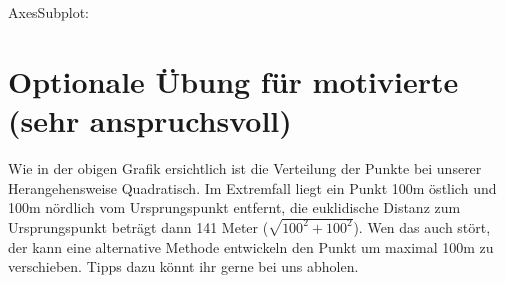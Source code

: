 \documentclass[letterpaper,10pt,english]{sphinxmanual}
\begin{document}
\begin{sphinxVerbatim}[commandchars=\\\{\}]
\PYGZlt{}AxesSubplot:\PYGZgt{}
\end{sphinxVerbatim}


\section{Optionale Übung für motivierte (sehr anspruchsvoll)}
\label{\detokenize{02_04_Einzelpunkt_Verschieben:optionale-ubung-fur-hochmotivierte-sehr-anspruchsvoll}}
Wie in der obigen Grafik ersichtlich ist die Verteilung der Punkte bei unserer Herangehensweise Quadratisch. Im Extremfall liegt ein Punkt 100m östlich und 100m nördlich vom Ursprungspunkt entfernt, die euklidische Distanz zum Ursprungspunkt beträgt dann 141 Meter (\(\sqrt{100^2+100^2}\)). Wen das auch stört, der kann eine alternative Methode entwickeln den Punkt um maximal 100m zu verschieben. Tipps dazu könnt ihr gerne bei uns abholen.
\end{document}
